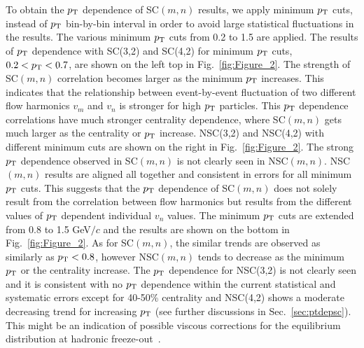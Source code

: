 \documentclass[ALICE,manyauthors]{cernphprep}
\begin{document}
To obtain the $p_{\rm T}$ dependence of SC$(m,n)$ results, we apply minimum $p_{\rm T}$ cuts, instead of $p_{\rm T}$ bin-by-bin interval in order to avoid large statistical fluctuations in the results. The various minimum $p_{\rm T}$ cuts from 0.2 to 1.5 are applied.
The results of $p_{\rm T}$ dependence with SC(3,2) and SC(4,2) for minimum $p_{\rm T}$ cuts, $0.2<p_{\rm T}<0.7$, are shown on the left top in Fig.~\ref{fig:Figure_2}.
The strength of SC$(m,n)$ correlation becomes larger as the minimum $p_{\rm T}$ increases. This indicates that the relationship between event-by-event fluctuation of two different flow harmonics $v_m$ and $v_n$ is stronger for high $p_{\rm T}$ particles. 
This $p_{\rm T}$ dependence correlations have much stronger centrality dependence, where SC$(m,n)$ gets much larger as the centrality or $p_{\rm T}$ increase. 
NSC(3,2) and NSC(4,2) with different minimum cuts are shown on the right in Fig.~\ref{fig:Figure_2}.
The strong $p_{\rm T}$ dependence observed in SC$(m,n)$ is not clearly seen in NSC$(m,n)$. NSC$(m,n)$ results are aligned all together and consistent in errors for all minimum $p_{\rm T}$ cuts. 
This suggests that the $p_{\rm T}$ dependence of SC$(m,n)$ does not solely result from the correlation between flow harmonics but results from the different values of $p_{\rm T}$  dependent individual $v_n$ values. 
The minimum $p_{\rm T}$ cuts are extended from 0.8  to 1.5 GeV$/c$ and the results are shown on the bottom in Fig.~\ref{fig:Figure_2}.
As for SC$(m,n)$, the similar trends are observed as similarly as $p_{\rm T}<0.8$, however NSC$(m,n)$ tends to decrease as the minimum $p_{\rm T}$ or the centrality increase.
The $p_{\rm T}$ dependence for NSC(3,2) is not clearly seen and it is consistent with no $p_{\rm T}$ dependence within the current statistical and systematic errors except for 40-50\% centrality
and NSC(4,2) shows a moderate decreasing trend for increasing $p_{\rm T}$ (see further discussions in Sec.~\ref{sec:ptdepsc}).
This might be an indication of possible viscous corrections for the equilibrium distribution at hadronic freeze-out~\cite{Luzum:2010ad}.
\end{document}
